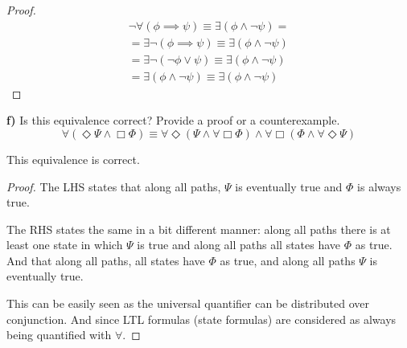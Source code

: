 \documentclass[titlepage, letterpaper, fleqn]{article}
\begin{document}
\begin{proof}
\begin{align*}
& \neg \forall(\phi \implies \psi) \equiv \exists (\phi \wedge \neg \psi) =
\\ & = \exists \neg (\phi \implies \psi) \equiv \exists (\phi \wedge \neg \psi) & \tag*{Duality of quantifiers}
\\ & = \exists \neg (\neg \phi \vee \psi) \equiv \exists (\phi \wedge \neg \psi) & \tag*{Material implication}
\\ & = \exists (\phi \wedge \neg \psi) \equiv \exists (\phi \wedge \neg \psi) & \tag*{de Morgan}
\end{align*}
\end{proof}

{\large \textbf{f)} Is this equivalence correct? Provide a proof or a counterexample.
\[\forall (\Diamond \Psi \wedge \Box \Phi) \equiv \forall \Diamond (\Psi \wedge \forall \Box \Phi) \wedge \forall \Box (\Phi \wedge \forall \Diamond \Psi)\]}

This equivalence is correct.

\begin{proof}
The LHS states that along all paths, \(\Psi\) is eventually true and \(\Phi\) is always true.

The RHS states the same in a bit different manner: along all paths there is at least one state in which \(\Psi\) is true and along all paths all states have \(\Phi\) as true. And that along all paths, all states have \(\Phi\) as true, and along all paths \(\Psi\) is eventually true.

This can be easily seen as the universal quantifier can be distributed over conjunction. And since LTL formulas (state formulas) are considered as always being quantified with \(\forall\).
\end{proof}
\end{document}
